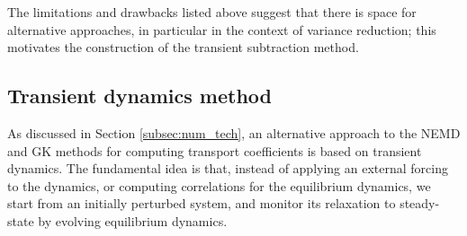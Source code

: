\begin{comment}
\paragraph{Transient methods.} While both Green--Kubo and nonequilibrium methods are based on steady-state dynamics, transient methods provide an alternative framework by monitoring the system’s relaxation to a steady-state after an initial perturbation, and can be classified into two main approaches:

\begin{enumerate}
    \item {\bf Equilibrium relaxation:} A typical scenario is to perturb an equilibrium system by creating an initial profile of momentum or energy, for instance, which is then allowed to relax to an equilibrium steady-state through the time-evolution of the equilibrium dynamics. During relaxation, the corresponding transient profiles are monitored, which are often fit to a macroscopic effective PDE parametrized by the transport coefficient at hand in order to estimate this transport coefficient by some form of "inverse problem fitting". Examples include the method proposed in \cite{hulse2005} to compute the thermal conductivity, the momentum impulse relaxation method \cite{MIR2000}, and the approach-to-equilibrium molecular dynamics method \cite{AEMD2013}.
            
    \item {\bf Nonequilibrium relaxation:} In a somewhat dual approach, one can alternatively start with an equilibrium system and drive it towards a nonequilibrium steady-state by applying an external forcing to the dynamics. The relaxation to a nonequilibrium steady-state is then monitored, from which the transport coefficient can be obtained. One example is the transient-time-correlation function (TTCF) method \cite{TTCF1987,TTCF1988}, which generalizes the Green--Kubo relations to nonlinear regimes.
\end{enumerate}
\end{comment}
The limitations and drawbacks listed above suggest that there is space for alternative approaches, in particular in the context of variance reduction; this motivates the construction of the transient subtraction method.

\subsection{Transient dynamics method}
\label{subsec:transient}
%
As discussed in Section \ref{subsec:num_tech}, an alternative approach to the NEMD and GK methods for computing transport coefficients is based on transient dynamics. The fundamental idea is that, instead of applying an external forcing to the dynamics, or computing correlations for the equilibrium dynamics, we start from an initially perturbed system, and monitor its relaxation to steady-state by evolving equilibrium dynamics.

